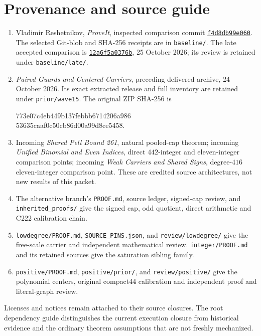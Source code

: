 \clearpage
\section{Provenance and source guide}
\begin{enumerate}
\item Vladimir Reshetnikov, \emph{ProveIt}, inspected comparison commit
\href{https://github.com/VladimirReshetnikov/ProveIt/commit/f4d8db99e060339f3306a04d507c35bc1d0d68c5}{\texttt{f4d8db99e060}}.
The selected Git-blob and SHA-256 receipts are in \texttt{baseline/}.
The late accepted comparison is
\href{https://github.com/VladimirReshetnikov/ProveIt/commit/12a6f5a0376b288cc8175e6016ea2c1258dd4bd4}{\texttt{12a6f5a0376b}},
25 October 2026; its review is retained under \texttt{baseline/late/}.
\item \emph{Paired Guards and Centered Carriers}, preceding delivered archive,
24 October 2026. Its exact extracted release and full inventory are retained
under \texttt{prior/wave15}. The original ZIP SHA-256 is
\begin{center}\small\ttfamily
773e07c4eb449b137febbb6714206a986\\53635caaf0c50cb86d00a99d8ce5458.
\end{center}
\item Incoming \emph{Shared Pell Bound 261}, natural pooled-cap theorem;
incoming \emph{Unified Binomial and Even Indices}, direct $442$-integer and
eleven-integer comparison points; incoming \emph{Weak Carriers and Shared
Signs}, degree-$416$ eleven-integer comparison point. These are credited
source architectures, not new results of this packet.
\item The alternative branch's \texttt{PROOF.md}, source ledger,
signed-cap review, and \texttt{inherited\_proofs/} give the
signed cap, odd quotient, direct arithmetic and C222 calibration chain.
\item \texttt{lowdegree/PROOF.md}, \texttt{SOURCE\_PINS.json}, and
\texttt{review/lowdegree/} give the free-scale carrier and independent
mathematical review. \texttt{integer/PROOF.md} and its retained sources give
the saturation sibling family.
\item \texttt{positive/PROOF.md}, \texttt{positive/prior/}, and
\texttt{review/positive/} give the polynomial centers, original compact44
calibration and independent proof and literal-graph review.
\end{enumerate}
Licenses and notices remain attached to their source closures. The root
dependency guide distinguishes the current execution closure from historical
evidence and the ordinary theorem assumptions that are not freshly mechanized.

